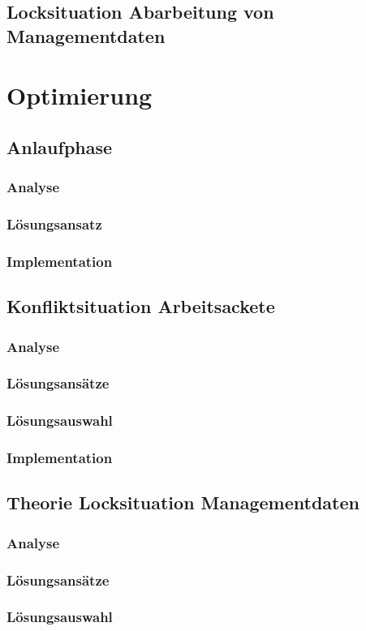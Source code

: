 \subsection{Locksituation Abarbeitung von Managementdaten}

\section{Optimierung}



\subsection{Anlaufphase}
\subsubsection{Analyse}
\subsubsection{L\"osungsansatz}
\subsubsection{Implementation}


\subsection{Konfliktsituation Arbeitsackete}
\subsubsection{Analyse}
\subsubsection{L\"osungsans\"atze}
\subsubsection{L\"osungsauswahl}

\subsubsection{Implementation}

\subsection{Theorie Locksituation Managementdaten}
\subsubsection{Analyse}
\subsubsection{L\"osungsans\"atze}
\subsubsection{L\"osungsauswahl}
